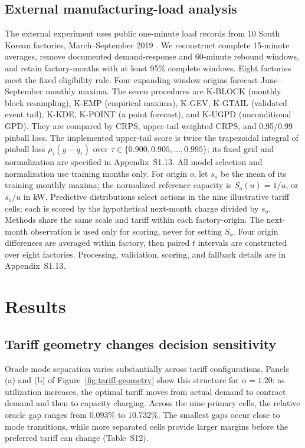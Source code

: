 \documentclass[suppldata]{interact}
\begin{document}
\subsection{External manufacturing-load analysis}
\label{sec:external-manufacturing}
The external experiment uses public one-minute load records from
10 South Korean factories, March--September 2019
\citep{Lee2022KoreanFactories,LeeFigshareV9}. We reconstruct complete
15-minute averages, remove documented demand-response and 60-minute
rebound windows, and retain factory-months with at least 95\%
complete windows. Eight factories meet the fixed eligibility rule.
Four expanding-window origins forecast June--September monthly maxima.
The seven procedures are K-BLOCK (monthly block resampling), K-EMP
(empirical maxima), K-GEV, K-GTAIL (validated event tail), K-KDE,
K-POINT (a point forecast), and K-UGPD (unconditional GPD).
They are compared by CRPS, upper-tail weighted CRPS, and 0.95/0.99
pinball loss. The implemented upper-tail score is twice the trapezoidal
integral of pinball loss $\rho_\tau(y-q_\tau)$ over
$\tau\in\{0.900,0.905,\ldots,0.995\}$; its fixed grid and
normalization are specified in Appendix~S1.13. All model selection
and normalization use training
months only. For origin $o$, let $s_o$ be the mean of its training
monthly maxima; the normalized reference capacity is $S_o(u)=1/u$,
or $s_o/u$ in kW. Predictive distributions select actions in the
nine illustrative tariff cells; each is scored by the hypothetical
next-month charge divided by $s_o$. Methods share the same scale and
tariff within each factory-origin. The next-month observation is used
only for scoring, never for setting $S_o$.
Four origin differences are averaged within factory, then paired
$t$ intervals are constructed over eight factories. Processing,
validation, scoring, and fallback details are in Appendix~S1.13.

\section{Results}
\label{sec:results}

\subsection{Tariff geometry changes decision sensitivity}
\label{sec:results-geometry}

Oracle mode separation varies substantially across tariff
configurations. Panels (a) and (b) of
Figure~\ref{fig:tariff-geometry} show this structure for
$\alpha=1.20$: as utilization increases, the optimal tariff moves
from actual demand to contract demand and then to capacity charging. Across the nine primary cells, the relative oracle gap ranges
from $0.093\%$ to $10.732\%$. The smallest gaps occur close to
mode transitions, while more separated cells provide larger margins
before the preferred tariff can change (Table~S12).
\end{document}

